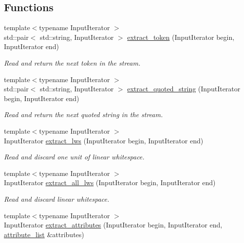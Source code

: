 \subsection*{Functions}
\begin{DoxyCompactItemize}
\item 
{\footnotesize template$<$typename Input\+Iterator $>$ }\\std\+::pair$<$ std\+::string, Input\+Iterator $>$ \hyperlink{namespacewebsocketpp_1_1http_1_1parser_af1d77875407d0c9fe69a3b66cc806f06}{extract\+\_\+token} (Input\+Iterator begin, Input\+Iterator end)
\begin{DoxyCompactList}\small\item\em Read and return the next token in the stream. \end{DoxyCompactList}\item 
{\footnotesize template$<$typename Input\+Iterator $>$ }\\std\+::pair$<$ std\+::string, Input\+Iterator $>$ \hyperlink{namespacewebsocketpp_1_1http_1_1parser_a7d623c6b891254ad33901ebb6879c81a}{extract\+\_\+quoted\+\_\+string} (Input\+Iterator begin, Input\+Iterator end)
\begin{DoxyCompactList}\small\item\em Read and return the next quoted string in the stream. \end{DoxyCompactList}\item 
{\footnotesize template$<$typename Input\+Iterator $>$ }\\Input\+Iterator \hyperlink{namespacewebsocketpp_1_1http_1_1parser_a1dacef9abccd8e5b6c572447d9f5a3ab}{extract\+\_\+lws} (Input\+Iterator begin, Input\+Iterator end)
\begin{DoxyCompactList}\small\item\em Read and discard one unit of linear whitespace. \end{DoxyCompactList}\item 
{\footnotesize template$<$typename Input\+Iterator $>$ }\\Input\+Iterator \hyperlink{namespacewebsocketpp_1_1http_1_1parser_a263c7c466bbed56948d5877b9c33c354}{extract\+\_\+all\+\_\+lws} (Input\+Iterator begin, Input\+Iterator end)
\begin{DoxyCompactList}\small\item\em Read and discard linear whitespace. \end{DoxyCompactList}\item 
{\footnotesize template$<$typename Input\+Iterator $>$ }\\Input\+Iterator \hyperlink{namespacewebsocketpp_1_1http_1_1parser_ac13fb3aca2101c9e6d2ee14039f1a758}{extract\+\_\+attributes} (Input\+Iterator begin, Input\+Iterator end, \hyperlink{namespacewebsocketpp_1_1http_a9744f4104772b987aa9e86c35ce1357b}{attribute\+\_\+list} \&attributes)

\end{DoxyCompactItemize}
